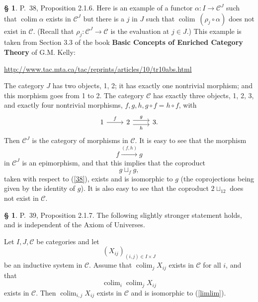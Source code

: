 \documentclass[12pt]{article}
\theoremstyle{remark}
\theoremstyle{definition}
\newtheorem{s}[thm]{\S}
\newcommand{\C}{\mathcal C}
\DeclareMathOperator*{\colim}{colim}
\begin{document}
\begin{s}\label{c38}
P.~38, Proposition 2.1.6. Here is an example of a functor $\alpha:I\to\C^J$ such that $\colim\alpha$ exists in $\C^J$ but there is a $j$ in $J$ such that $\colim\ (\rho_j\circ\alpha)$ does not exist in $\C$. (Recall that $\rho_j:\C^J\to\C$ is the evaluation at $j\in J$.) This example is taken from Section 3.3 of the book \textbf{Basic Concepts of Enriched Category Theory} of G.M. Kelly:%
%
\begin{center}\href{http://www.tac.mta.ca/tac/reprints/articles/10/tr10abs.html}{http://www.tac.mta.ca/tac/reprints/articles/10/tr10abs.html}
\end{center}

The category $J$ has two objects, 1, 2; it has exactly one nontrivial morphism; and this morphism goes from 1 to 2. The category $\C$ has exactly three objects, 1, 2, 3, and exactly four nontrivial morphisms, $f,g,h,g\circ f=h\circ f$, with 
$$
\begin{tikzcd}
1\ar{r}{f}&2\ar[yshift=.7ex]{r}{g}\ar[yshift=-.7ex]{r}[swap]{h}&3.
\end{tikzcd}
$$ 
Then $\C^J$ is the category of morphisms in $\C$. It is easy to see that the morphism 
%
\begin{equation}\label{38}
f\xrightarrow{(f,h)}g 
\end{equation}
%
in $\C^J$ is an epimorphism, and that this implies that the coproduct 
$$
g\sqcup_fg,
$$ 
taken with respect to (\ref{38}), exists and is isomorphic to $g$ (the coprojections being given by the identity of $g$). It is also easy to see that the coproduct $2\sqcup_12$ does not exist in $\C$.
\end{s}

%

\begin{s} 
P.~39, Proposition 2.1.7. The following slightly stronger statement holds, and is independent of the Axiom of Universes. 

Let $I, J, \C$ be categories and let 
$$
(X_{ij})_{(i,j)\in I\times J}
$$ 
be an inductive system in $\C$. Assume that $\colim_jX_{ij}$ exists in $\C$ for all $i$, and that 
\begin{equation}\label{limlim}
\colim_i\colim_jX_{ij}
\end{equation}
exists in $\C$. Then $\colim_{i,j}X_{ij}$ exists in $\C$ and is isomorphic to (\ref{limlim}).
\end{s}

%
\end{document}

